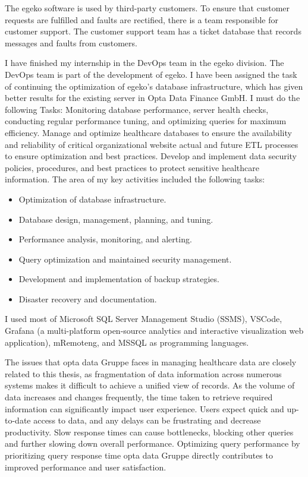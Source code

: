 The egeko software is used by third-party customers. To ensure that customer requests are fulfilled and faults are rectified, there is a team responsible for customer support. The customer support team has a ticket database that records messages and faults from customers.\vspace{.4cm}

I have finished my internship in the DevOps team in the egeko division. The DevOps team is part of the development of egeko. I have been assigned the task of continuing the optimization of egeko's database infrastructure, which has given better results for the existing server in Opta Data Finance GmbH. I must do the following Tasks: Monitoring database performance, server health checks, conducting regular performance tuning, and optimizing queries for maximum efficiency. Manage and optimize healthcare databases to ensure the availability and reliability of critical organizational website actual and future ETL processes to ensure optimization and best practices. Develop and implement data security policies, procedures, and best practices to protect sensitive healthcare information. The area of my key activities included the following tasks:\vspace{.4cm}
\begin{itemize}
    \item Optimization of database infrastructure.
    \item Database design, management, planning, and tuning.
    \item Performance analysis, monitoring, and alerting.
    \item Query optimization and maintained security management.
    \item Development and implementation of backup strategies.
    \item Disaster recovery and documentation.
\end{itemize}

I used most of Microsoft SQL Server Management Studio (SSMS), VSCode, Grafana (a multi-platform open-source analytics and interactive visualization web application), mRemoteng, and MSSQL as programming languages.\vspace{.4cm}

The issues that opta data Gruppe faces in managing healthcare data are closely related to this thesis, as fragmentation of data information across numerous systems makes it difficult to achieve a unified view of records. As the volume of data increases and changes frequently, the time taken to retrieve required information can significantly impact user experience. Users expect quick and up-to-date access to data, and any delays can be frustrating and decrease productivity. Slow response times can cause bottlenecks, blocking other queries and further slowing down overall performance. Optimizing query performance by prioritizing query response time opta data Gruppe directly contributes to improved performance and user satisfaction.

